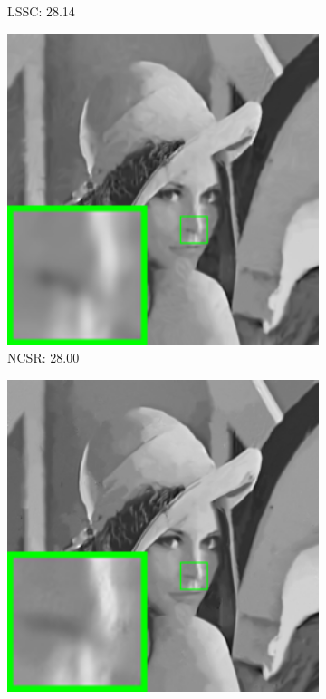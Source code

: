 \begin{figure}
\begin{adjustwidth}{-2cm}{}
\begin{subfigure}[t]{0.19\textwidth}
		\caption{LSSC: 28.14}
    \end{subfigure}
    \hfill
    \begin{subfigure}[t]{0.19\textwidth}
        \centering
        \includegraphics[width=1\textwidth]{images/twsc/awgn/resize_br_NCSR_60_lena.png}
		\caption{NCSR: 28.00}
    \end{subfigure}
    \hfill
    \begin{subfigure}[t]{0.19\textwidth}
        \centering
        \includegraphics[width=1\textwidth]{images/twsc/awgn/resize_br_WNNM_60_lena.png}

\end{subfigure}
\end{adjustwidth}
\end{figure}
